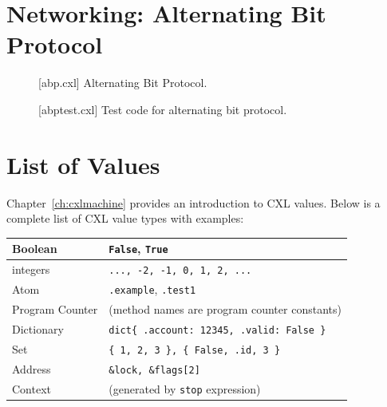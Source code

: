 \documentclass{report}
\newenvironment{code}{
\tcolorbox
}{
\endtcolorbox
}
\begin{document}
\chapter{Networking: Alternating Bit Protocol}
\label{ch:abp}

\begin{figure}
\begin{code}
\end{code}
\caption{[abp.cxl] Alternating Bit Protocol.}
\label{fig:abp}
\end{figure}

\begin{figure}
\begin{code}
\end{code}
\caption{[abptest.cxl] Test code for alternating bit protocol.}
\label{fig:abptest}
\end{figure}




\appendix

\chapter{List of Values}

Chapter~\ref{ch:cxlmachine} provides an introduction to CXL values.
Below is a complete list of CXL value types with examples:

\vspace{1em}
\begin{tabular}{|l|l|}
\hline
Boolean & \texttt{False}, \texttt{True} \\
\hline
integers & \texttt{..., -2, -1, 0, 1, 2, ...} \\
\hline
Atom & \texttt{.example}, \texttt{.test1} \\
\hline
Program Counter & (method names are program counter constants) \\
\hline
Dictionary & \texttt{dict\{ .account: 12345, .valid: False \} } \\
\hline
Set & \texttt{\{ 1, 2, 3 \}, \{ False, .id, 3 \} } \\
\hline
Address & \texttt{\&lock, \&flags[2]} \\
\hline
Context & (generated by \texttt{stop} expression) \\
\hline
\end{tabular}
\vspace{1em}
\end{document}
